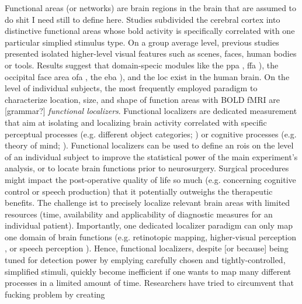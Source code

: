 Functional areas (or networks) are brain regions in the brain that are assumed
to do shit I need still to define here.
%
Studies subdivided the cerebral cortex into distinctive functional areas whose
\ac{bold} activity is specifically correlated with one particular simplied
stimulus type.
On a group average level, previous studies presented isolated higher-level
visual features such as scenes, faces, human bodies or tools.
Results suggest that domain-specic modules like the \ac{ppa}
\citep{epstein1998ppa}, \ac{ffa} \citep{kanwisher1997ffa}), the occipital face
area \ac{ofa} \citep{pitcher2011occipitalfacearea}, the \ac{eba}
\citep{downing2001bodyarea}), and the \ac{loc} \citet{malach1995loc} exist in
the human brain.
On the level of individual subjects, the most frequently employed paradigm to
characterize location, size, and shape of function areas with BOLD fMRI are
[grammar?] \textit{functional localizers}.
Functional localizers are dedicated measurement that aim at isolating and
localizing brain activity correlated with specific perceptual processes (e.g.
different object categories; \citet{kanwisher1997ffa}) or cognitive processes
(e.g. theory of mind; \citet{spunt2014validating}).
Functional localizers can be used to define an \acp{roi} on the level of an
individual subject to improve the statistical power of the main experiment's
analysis, or to locate brain functions prior to neurosurgery.
Surgical procedures might impact the post-operative quality of life so much
(e.g. concerning cognitive control or speech production) that it potentially
outweighs the therapeutic benefits.
The challenge ist to precisely localize relevant brain areas with limited
resources (time, availability and applicability of diagnostic measures for an
individual patient).
Importantly, one dedicated localizer paradigm can only map one domain of brain
functions (e.g. retinotopic mapping, higher-visual perception
\citet{kanwisher1997ffa}, or speech perception
\citet{fernandez2001language}).
Hence, functional localizers, despite [or because] being tuned for detection
power by emplying carefully chosen and tightly-controlled, simplified stimuli,
quickly become inefficient if one wants to map many different processes in a
limited amount of time.
Researchers have tried to circumvent that fucking problem by creating
